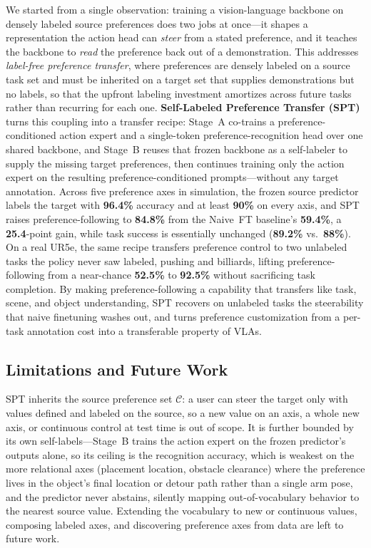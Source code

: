 \documentclass{article}
\begin{document}
We started from a single observation: training a vision-language backbone on densely labeled source preferences does two jobs at once---it shapes a representation the action head can \emph{steer} from a stated preference, and it teaches the backbone to \emph{read} the preference back out of a demonstration. This addresses \emph{label-free preference transfer}, where preferences are densely labeled on a source task set and must be inherited on a target set that supplies demonstrations but no labels, so that the upfront labeling investment amortizes across future tasks rather than recurring for each one. \textbf{Self-Labeled Preference Transfer (SPT)} turns this coupling into a transfer recipe: Stage~A co-trains a preference-conditioned action expert and a single-token preference-recognition head over one shared backbone, and Stage~B reuses that frozen backbone as a self-labeler to supply the missing target preferences, then continues training only the action expert on the resulting preference-conditioned prompts---without any target annotation. Across five preference axes in simulation, the frozen source predictor labels the target with \textbf{96.4\%} accuracy and at least \textbf{90\%} on every axis, and SPT raises preference-following to \textbf{84.8\%} from the Naive~FT baseline's \textbf{59.4\%}, a \textbf{25.4}-point gain, while task success is essentially unchanged (\textbf{89.2\%} vs.\ \textbf{88\%}). On a real UR5e, the same recipe transfers preference control to two unlabeled tasks the policy never saw labeled, pushing and billiards, lifting preference-following from a near-chance \textbf{52.5\%} to \textbf{92.5\%} without sacrificing task completion. By making preference-following a capability that transfers like task, scene, and object understanding, SPT recovers on unlabeled tasks the steerability that naive finetuning washes out, and turns preference customization from a per-task annotation cost into a transferable property of VLAs.

\subsection{Limitations and Future Work}
\label{sec:limitations}

SPT inherits the source preference set $\mathcal{C}$: a user can steer the target only with values defined and labeled on the source, so a new value on an axis, a whole new axis, or continuous control at test time is out of scope. It is further bounded by its own self-labels---Stage~B trains the action expert on the frozen predictor's outputs alone, so its ceiling is the recognition accuracy, which is weakest on the more relational axes (placement location, obstacle clearance) where the preference lives in the object's final location or detour path rather than a single arm pose, and the predictor never abstains, silently mapping out-of-vocabulary behavior to the nearest source value. Extending the vocabulary to new or continuous values, composing labeled axes, and discovering preference axes from data are left to future work.
\end{document}
